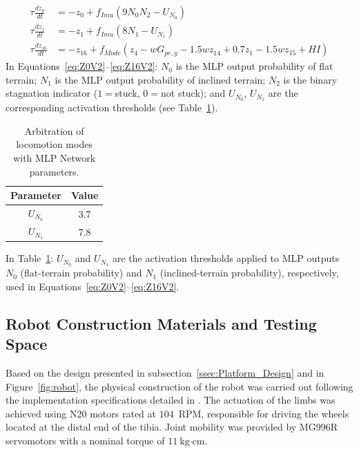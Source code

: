 \documentclass[preprint,12pt]{elsarticle}
\begin{document}
\begin{align}
\tau \frac{dz_0}{dt} &= -z_0 + f_{Imu}(9 N_{0} N_{2} - U_{N_{0}})
\label{eq:Z0V2}
\\
\tau \frac{dz_1}{dt} &= -z_1 +  f_{Imu}(8 N_{1} - U_{N_{1}})
\\
\tau \frac{dz_{16}}{dt} &= -z_{16} +  f_{Mode}( z_4 - wG_{pe,y} - 1.5wz_{14}  + 0.7z_1 - 1.5wz_{15} + HI)
\label{eq:Z16V2}
\end{align}
In Equations~\eqref{eq:Z0V2}–\eqref{eq:Z16V2}: $N_0$ is the MLP output probability of flat terrain; $N_1$ is the MLP output probability of inclined terrain; $N_2$ is the binary stagnation indicator ($1 ={}$stuck, $0 ={}$not stuck); and $U_{N_0}$, $U_{N_1}$ are the corresponding activation thresholds (see Table~\ref{table:Locom_MLP}). %

\begin{table}%
\centering
\caption{Arbitration of locomotion modes with MLP Network parameters.}
\begin{tabular}{|c|c|}
\hline
\textbf{Parameter} & \textbf{Value} \\ \hline

$U_{N_{0}}$ & 3.7 \\ \hline
$U_{N_{1}}$ & 7.8 \\ \hline

\end{tabular}
\label{table:Locom_MLP}
\end{table}
In Table~\ref{table:Locom_MLP}: $U_{N_0}$ and $U_{N_1}$ are the activation thresholds applied to MLP outputs $N_0$ (flat-terrain probability) and $N_1$ (inclined-terrain probability), respectively, used in Equations~\eqref{eq:Z0V2}--\eqref{eq:Z16V2}.

\subsection{Robot Construction Materials and Testing Space}
\label{ssec:Construction}

Based on the design presented in subsection~\ref{ssec:Platform_Design} and in Figure~\ref{fig:robot}, the physical construction of the robot was carried out following the implementation specifications detailed in \citep{Grajales_Des_2025}. The actuation of the limbs was achieved using N20 motors rated at $104$~RPM, responsible for driving the wheels located at the distal end of the tibia. Joint mobility was provided by MG996R servomotors with a nominal torque of $11~\text{kg·cm}$. 
\end{document}
